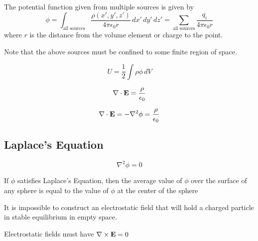 \documentclass[a4paper]{article}
\begin{document}
\begin{thm}[Superposition] The potential function given from multiple sources is given by $$\phi=\int_{\text{all sources}}\frac{\rho(x',y',z')}{4\pi\epsilon_0r}\,dx'\,dy'\,dz'=\sum_{\text{all sources}}\frac{q_i}{4\pi\epsilon_0r}$$ where $r$ is the distance from the volume element or charge to the point. 
\end{thm}

Note that the above sources must be confined to some finite region of space. 

\begin{thm} $$U=\frac{1}{2}\int\rho\phi\,dV$$
\end{thm}

\begin{thm} $$\nabla\cdot\vb{E}=\frac{\rho}{\epsilon_0}$$
\end{thm}

\begin{thm} $$\nabla\cdot\vb{E}=-\nabla^2\phi=\frac{\rho}{\epsilon_0}$$
\end{thm}

\subsection{Laplace's Equation}
\begin{defn} $$\nabla^2\phi=0$$
\end{defn}

\begin{thm} If $\phi$ satisfies Laplace's Equation, then the average value of $\phi$ over the surface of any sphere is equal to the value of $\phi$ at the center of the sphere
\end{thm}

\begin{thm} It is impossible to construct an electrostatic field that will hold a charged particle in stable equilibrium in empty space. 
\end{thm}

\begin{thm} Electrostatic fields must have $\nabla\times\vb{E}=0$
\end{thm}

\pagebreak
\end{document}
